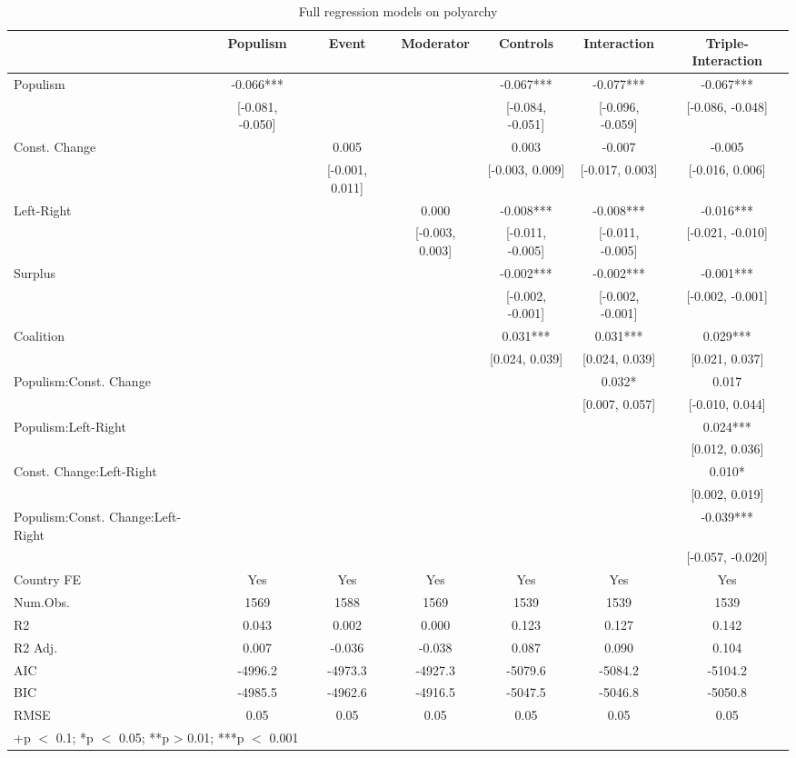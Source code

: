 \documentclass[
  abstract]{article}
\begin{document}
\renewcommand{\arraystretch}{0.5}
\setlength{\tabcolsep}{2pt}

\hypertarget{tbl-egaldem}{}
\begin{table}
\caption{\label{tbl-egaldem}Full regression models on polyarchy }\tabularnewline

\centering\centering\centering
\begin{tabular}[t]{lcccccc}
\toprule
  & Populism & Event & Moderator & Controls & Interaction & Triple-Interaction\\
\midrule
Populism & -0.066*** &  &  & -0.067*** & -0.077*** & -0.067***\\
 & {}[-0.081, -0.050] &  &  & {}[-0.084, -0.051] & {}[-0.096, -0.059] & {}[-0.086, -0.048]\\
Const. Change &  & 0.005 &  & 0.003 & -0.007 & -0.005\\
 &  & {}[-0.001, 0.011] &  & {}[-0.003, 0.009] & {}[-0.017, 0.003] & {}[-0.016, 0.006]\\
Left-Right &  &  & 0.000 & -0.008*** & -0.008*** & -0.016***\\
 &  &  & {}[-0.003, 0.003] & {}[-0.011, -0.005] & {}[-0.011, -0.005] & {}[-0.021, -0.010]\\
Surplus &  &  &  & -0.002*** & -0.002*** & -0.001***\\
 &  &  &  & {}[-0.002, -0.001] & {}[-0.002, -0.001] & {}[-0.002, -0.001]\\
Coalition &  &  &  & 0.031*** & 0.031*** & 0.029***\\
 &  &  &  & {}[0.024, 0.039] & {}[0.024, 0.039] & {}[0.021, 0.037]\\
Populism:Const. Change &  &  &  &  & 0.032* & 0.017\\
 &  &  &  &  & {}[0.007, 0.057] & {}[-0.010, 0.044]\\
Populism:Left-Right &  &  &  &  &  & 0.024***\\
 &  &  &  &  &  & {}[0.012, 0.036]\\
Const. Change:Left-Right &  &  &  &  &  & 0.010*\\
 &  &  &  &  &  & {}[0.002, 0.019]\\
Populism:Const. Change:Left-Right &  &  &  &  &  & -0.039***\\
 &  &  &  &  &  & {}[-0.057, -0.020]\\
\midrule
Country FE & Yes & Yes & Yes & Yes & Yes & Yes\\
Num.Obs. & 1569 & 1588 & 1569 & 1539 & 1539 & 1539\\
R2 & 0.043 & 0.002 & 0.000 & 0.123 & 0.127 & 0.142\\
R2 Adj. & 0.007 & -0.036 & -0.038 & 0.087 & 0.090 & 0.104\\
AIC & -4996.2 & -4973.3 & -4927.3 & -5079.6 & -5084.2 & -5104.2\\
BIC & -4985.5 & -4962.6 & -4916.5 & -5047.5 & -5046.8 & -5050.8\\
RMSE & 0.05 & 0.05 & 0.05 & 0.05 & 0.05 & 0.05\\
\bottomrule
\multicolumn{7}{l}{\rule{0pt}{1em}+p $<$ 0.1; *p $<$ 0.05; **p > 0.01; ***p $<$ 0.001}\\
\end{tabular}
\end{table}
\end{document}
